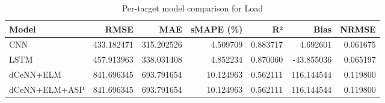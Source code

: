 \begin{table}
\caption{Per-target model comparison for Load}
\begin{tabular}{lrrrrrr}
\toprule
Model & RMSE & MAE & sMAPE (\%) & R² & Bias & NRMSE \\
\midrule
CNN & 433.182471 & 315.202526 & 4.509709 & 0.883717 & 4.692601 & 0.061675 \\
LSTM & 457.913963 & 338.031408 & 4.852234 & 0.870060 & -43.855036 & 0.065197 \\
dCeNN+ELM & 841.696345 & 693.791654 & 10.124963 & 0.562111 & 116.144544 & 0.119800 \\
dCeNN+ELM+ASP & 841.696345 & 693.791654 & 10.124963 & 0.562111 & 116.144544 & 0.119800 \\
\bottomrule
\end{tabular}
\end{table}
